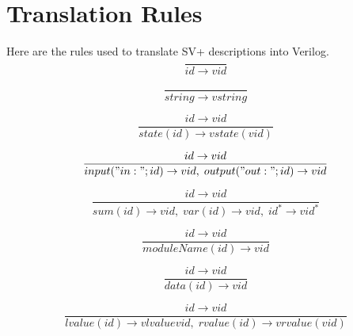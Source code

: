 \section{Translation Rules}\label{sec:rules}
Here are the rules used to translate SV+ descriptions into Verilog.
\begin{equation}
\frac{}{id \rightarrow vid}
\end{equation}

\begin{equation}
\frac{}{string \rightarrow vstring}
\end{equation}

\begin{equation}
\frac{id \rightarrow vid}{state(id) \rightarrow vstate(vid)}
\end{equation}

\begin{equation}
\frac{id \rightarrow vid}{input("in:";id) \rightarrow vid,\; output("out:";id) \rightarrow vid}
\end{equation}

\begin{equation}
\frac{id \rightarrow vid}{sum(id) \rightarrow vid,\;var(id) \rightarrow vid,\;id^* \rightarrow vid^*}
\end{equation}

\begin{equation}
\frac{id \rightarrow vid}{moduleName(id) \rightarrow vid}
\end{equation}

\begin{equation}
\frac{id \rightarrow vid}{data(id) \rightarrow vid}
\end{equation}

\begin{equation}
\frac{id \rightarrow vid}{lvalue(id) \rightarrow vlvalue{vid},\; rvalue(id) \rightarrow vrvalue(vid)}
\end{equation}


